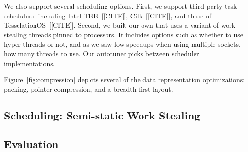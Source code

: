 \begin{itemize}
We also support several scheduling options. First, we support third-party task schedulers, including Intel TBB~[[CITE]], Cilk~[[CITE]], and those of TesselationOS~[[CITE]]. Second, we built our own that uses a variant of work-stealing threads pinned to processors. It includes options such as whether to use hyper threads or not, and as we saw low speedups when using multiple sockets, how many threads to  use. Our autotuner picks between scheduler implementations.

\end{itemize}

Figure~\ref{fig:compression} depicts several of the data representation optimizations: packing, pointer compression, and a breadth-first layout. 





\subsection{Scheduling: Semi-static Work Stealing}
\subsection{Evaluation}
